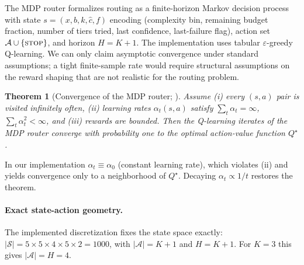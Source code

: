 \documentclass[11pt]{article}
\newtheorem{theorem}{Theorem}
\theoremstyle{definition}
\begin{document}
The MDP router formalizes routing as a finite-horizon Markov decision
process with state $s = (x, b, k, \widehat{c}, f)$ encoding (complexity bin,
remaining budget fraction, number of tiers tried, last confidence,
last-failure flag), action set $\mathcal{A} \cup \{\textsc{stop}\}$, and
horizon $H = K+1$. The implementation uses tabular $\varepsilon$-greedy
Q-learning. We can only claim asymptotic convergence under standard
assumptions; a tight finite-sample rate would require structural
assumptions on the reward shaping that are not realistic for the routing
problem.

\begin{theorem}[Convergence of the MDP router; \cite{watkins1992qlearning,tsitsiklis1994asynchronous}]
\label{thm:qlearning}
Assume (i) every $(s,a)$ pair is visited infinitely often, (ii) learning
rates $\alpha_t(s,a)$ satisfy $\sum_t \alpha_t = \infty$,
$\sum_t \alpha_t^2 < \infty$, and (iii) rewards are bounded. Then the
Q-learning iterates of the MDP router converge with probability one to
the optimal action-value function $Q^\star$.
\end{theorem}

In our implementation $\alpha_t \equiv \alpha_0$ (constant learning rate),
which violates (ii) and yields convergence only to a neighborhood of
$Q^\star$. Decaying $\alpha_t \propto 1/t$ restores the theorem.

\paragraph{Exact state-action geometry.}
The implemented discretization fixes the state space exactly:
$|\mathcal{S}| = 5 \times 5 \times 4 \times 5 \times 2 = 1000$, with
$|\mathcal{A}| = K+1$ and $H = K+1$. For $K=3$ this gives
$|\mathcal{A}| = H = 4$.
\end{document}
